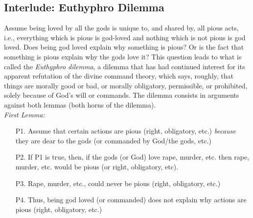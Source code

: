 \documentclass[oneside]{article}
\begin{document}
\begin{description}
\section{Interlude: Euthyphro Dilemma}


Assume being loved by all the gods is unique to, and shared by, all pious acts, i.e., everything which is pious is god-loved and nothing which is not pious is god loved. Does being god loved explain why something is pious? Or is the fact that something is pious explain why the gods love it? This question leads to what is called the \emph{Euthyphro dilemma}, a dilemma that has had continued interest for its apparent refutation of the divine command theory, which says, roughly, that things are morally good or bad, or morally obligatory, permissible, or prohibited, solely because of God’s will or commands. The dilemma consists in arguments against both lemmas (both horns of the dilemma).\\

\noindent \emph{First Lemma:}

\begin{enumerate}
\item[P1.] Assume that certain actions are pious (right,  obligatory, etc.) \emph{because} they are dear to the gods (or commanded by God/the gods, etc.)
\item[P2.] If P1 is true, then, if the gods (or God) love rape, murder, etc. then rape, murder, etc. would be pious (or right, obligatory, etc). 
\item[P3.] Rape, murder, etc., could never be pious (right, obligatory, etc.) 
\item[P4.] Thus, being god loved (or commanded) does not explain why actions are pious (right, obligatory, etc.)
\end{enumerate}


\end{description}
\end{document}
